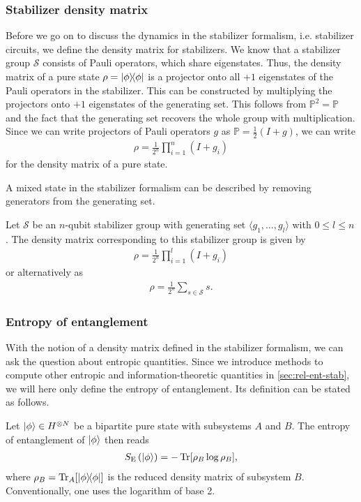\subsubsection{Stabilizer density matrix}
Before we go on to discuss the dynamics in the stabilizer formalism, i.e.
stabilizer circuits, we define the density matrix for stabilizers. We know that
a stabilizer group $\mathcal{S}$ consists of Pauli operators, which share eigenstates. 
Thus, the density matrix of a pure state $\rho = \dyad{\phi}$ is a
projector onto all $+1$ eigenstates of the Pauli operators in the stabilizer.
This can be constructed by multiplying the projectors onto $+1$ eigenstates of
the generating set. This follows from $\mathbb{P}^2 = \mathbb{P}$ and the fact
that the generating set recovers the whole group with multiplication. Since we
can write projectors of Pauli operators $g$ as $\mathbb{P} = \frac{1}{2}(I+g)$,
we can write
\begin{align}
  \rho = \frac{1}{2^n} \prod_{i=1}^n (I + g_i)
\end{align}
for the density matrix of a pure state.

A mixed state in the stabilizer formalism can be described by removing
generators from the generating set. 
\begin{defn}\label{defn:stab-dmat}
  Let $\mathcal{S}$ be an $n$-qubit stabilizer group with generating set
  $\langle g_1, \ldots, g_l \rangle$ with $0 \leq l \leq n$. The density matrix
  corresponding to this stabilizer group is given by
  \begin{align}
    \rho = \frac{1}{2^n} \prod_{i=1}^l (I + g_i)
  \end{align}
  or alternatively as
  \begin{align}
    \rho = \frac{1}{2^n} \sum_{s \in \mathcal{S}} s
  .\end{align}
\end{defn}

\subsubsection{Entropy of entanglement}

With the notion of a density matrix defined in the stabilizer formalism, we can
ask the question about entropic quantities. Since we introduce methods to
compute other entropic and information-theoretic quantities in
\cref{sec:rel-ent-stab}, we will here only define the entropy of entanglement.
Its definition can be stated as follows.
\begin{defn}\label{defn:entent}
  Let $\ket{\phi}\in H^{\otimes N}$ be a bipartite pure state with subsystems
  $A$ and $B$. The entropy of entanglement of $\ket{\phi}$ then reads
  \begin{align}
    S_\mathrm{E}\left(\ket{\phi}\right) = - \Tr[\rho_B \log \rho_B],
  \end{align}
  where $\rho_B = \Tr_A[\dyad{\phi}]$ is the reduced density matrix of subsystem
  $B$. Conventionally, one uses the logarithm of base 2.
\end{defn}

